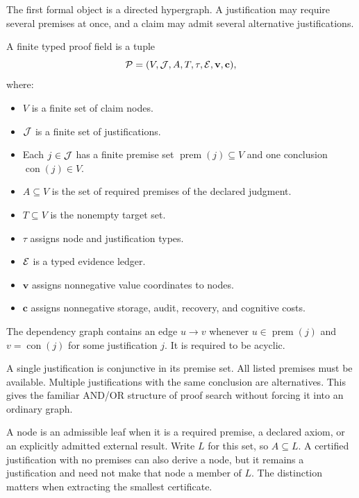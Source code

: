 The first formal object is a directed hypergraph. A justification may require several premises at once, and a claim may admit several alternative justifications.

\begin{PPTdefinition}
\label{PPT:res:3:1}
A finite typed proof field is a tuple
\[
\mathcal P=(V,\mathcal J,A,T,\tau,\mathcal E,\mathbf v,\mathbf c),
\]
where:
\begin{itemize}
\item $V$ is a finite set of claim nodes.
\item $\mathcal J$ is a finite set of justifications.
\item Each $j\in\mathcal J$ has a finite premise set $\operatorname{prem}(j)\subseteq V$ and one conclusion $\operatorname{con}(j)\in V$.
\item $A\subseteq V$ is the set of required premises of the declared judgment.
\item $T\subseteq V$ is the nonempty target set.
\item $\tau$ assigns node and justification types.
\item $\mathcal E$ is a typed evidence ledger.
\item $\mathbf v$ assigns nonnegative value coordinates to nodes.
\item $\mathbf c$ assigns nonnegative storage, audit, recovery, and cognitive costs.
\end{itemize}
The dependency graph contains an edge $u\to v$ whenever $u\in\operatorname{prem}(j)$ and $v=\operatorname{con}(j)$ for some justification $j$. It is required to be acyclic.
\end{PPTdefinition}

A single justification is conjunctive in its premise set. All listed premises must be available. Multiple justifications with the same conclusion are alternatives. This gives the familiar AND/OR structure of proof search without forcing it into an ordinary graph.

\begin{PPTdefinition}
\label{PPT:res:3:2}
A node is an admissible leaf when it is a required premise, a declared axiom, or an explicitly admitted external result. Write $L$ for this set, so $A\subseteq L$. A certified justification with no premises can also derive a node, but it remains a justification and need not make that node a member of $L$. The distinction matters when extracting the smallest certificate.
\end{PPTdefinition}

